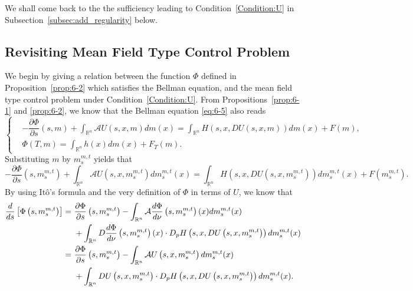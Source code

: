 \documentclass[11pt]{article}
\numberwithin{equation}{section}
\newcommand{\brn}{{\mathbb{R}^n}}
\newcommand{\1}{\mbox{1\hspace{-1mm}I}}
\begin{document}
We shall come back to the the sufficiency leading to Condition~\ref{Condition:U} in Subsection~\ref{subsec:add_regularity} below. 


\subsection{Revisiting Mean Field Type Control Problem}

We begin by giving a relation between the function $\Phi$ defined in Proposition~\ref{prop:6-2} which satisfies the Bellman equation, and the mean field type control problem under Condition~\ref{Condition:U}. From Propositions~\ref{prop:6-1} and \ref{prop:6-2}, we know that the Bellman equation \eqref{eq:6-5} also reads 
\begin{equation*}\label{eq:6-7}
    \left\{
        \begin{aligned}
            &-\dfrac{\partial \Phi}{\partial s}(s,m)+\int_{\brn}\mathcal{A}U(s,x,m)dm(x)=\int_{\brn}H\left(s,x,DU(s,x,m)\right)dm(x)+F(m),\\
            &\Phi(T,m)=\int_{\brn}h(x)dm(x)+F_{T}(m).
        \end{aligned}
    \right.
\end{equation*} 
Substituting $m$ by $m^{m,t}_s$ yields that
\begin{equation}\label{eq:6-8}
    -\dfrac{\partial \Phi}{\partial s}\left(s,m^{m,t}_s\right)+\int_{\brn}\mathcal{A}U\left(s,x,m^{m,t}_s\right)dm^{m,t}_s(x)=\int_{\brn}H\left(s,x,DU\left(s,x,m^{m,t}_s\right)\right)dm^{m,t}_s(x)+F\left(m^{m,t}_s\right).
\end{equation}
By using It\^o's formula and the very definition of $\Phi$ in terms of $U$, we know that
\begin{align}
    \dfrac{d}{ds}\left[\Phi\left(s,m^{m,t}_s\right)\right]=\ & \dfrac{\partial\Phi}{\partial s}\left(s,m^{m,t}_s\right)-\int_{\brn}\mathcal{A}\dfrac{d\Phi}{d\nu}\left(s,m^{m,t}_s\right)(x)dm^{m,t}_s(x) \notag\\
    &+\int_{\brn}D\dfrac{d\Phi}{d\nu}\left(s,m^{m,t}_s\right)(x)\cdot D_p H\left(s,x,DU\left(s,x,m^{m,t}_s\right)\right)dm^{m,t}_s(x) \notag\\
    =\ & \dfrac{\partial\Phi}{\partial s}\left(s,m^{m,t}_s\right)-\int_{\brn}\mathcal{A}U\left(s,x,m^{m,t}_s\right)dm^{m,t}_s(x)\notag\\
    &+\int_{\brn}DU\left(s,x,m^{m,t}_s\right)\cdot D_pH\left(s,x,DU\left(s,x,m^{m,t}_s\right)\right)dm^{m,t}_s(x). \label{eq:6-9}
\end{align}
\end{document}
